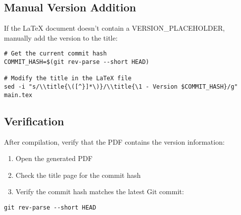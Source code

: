\subsection{Manual Version Addition}

If the LaTeX document doesn't contain a VERSION\_PLACEHOLDER, manually add the version to the title:

\begin{verbatim}
# Get the current commit hash
COMMIT_HASH=$(git rev-parse --short HEAD)

# Modify the title in the LaTeX file
sed -i "s/\\title{\([^}]*\)}/\\title{\1 - Version $COMMIT_HASH}/g" main.tex
\end{verbatim}

\subsection{Verification}

After compilation, verify that the PDF contains the version information:

\begin{enumerate}
    \item Open the generated PDF
    \item Check the title page for the commit hash
    \item Verify the commit hash matches the latest Git commit:
\end{enumerate}

\begin{verbatim}
git rev-parse --short HEAD
\end{verbatim}
